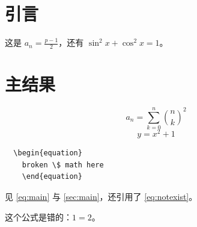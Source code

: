 ﻿\documentclass{ctexart}
\begin{document}
\section{引言}\label{sec:intro}
这是 $a_n = \frac{p-1}{2}$，还有 $\sin^2 x + \cos^2 x = 1$。

\section{主结果}\label{sec:main}
\begin{equation}\label{eq:main}
  a_n = \sum_{k=0}^{n} \binom{n}{k}^{2}
\end{equation}
\begin{equation}\label{eq:orphan}
  y = x^{2} + 1
\end{equation}

\begin{verbatim}
  \begin{equation}
    broken \$ math here
    \end{equation}
\end{verbatim}

见 \ref{eq:main} 与 \eqref{sec:main}，还引用了 \ref{eq:notexist}。

这个公式是错的：$1 = 2$。
\end{document}
